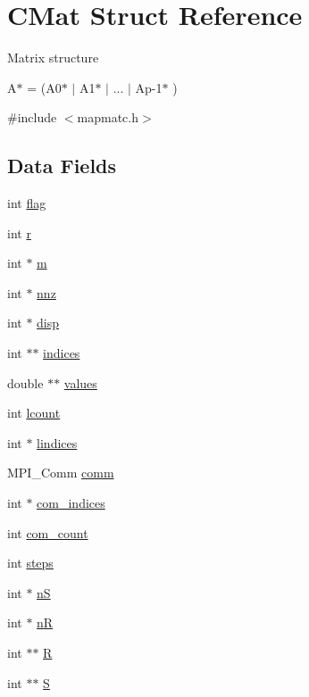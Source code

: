 \hypertarget{structCMat}{\section{C\-Mat Struct Reference}
\label{structCMat}
}


Matrix structure \par
 A$\ast$ = (A0$\ast$ $|$ A1$\ast$ $|$ ... $|$ Ap-\/1$\ast$ )  




{\ttfamily \#include $<$mapmatc.\-h$>$}

\subsection*{Data Fields}
\begin{DoxyCompactItemize}
\item 
int \hyperlink{structCMat_a60c04e2249af43059a609a437205bead}{flag}
\item 
int \hyperlink{structCMat_aaa75f5afbded481f194bfff507ebe551}{r}
\item 
int $\ast$ \hyperlink{structCMat_a6837ab815749a87fa96084527166b564}{m}
\item 
int $\ast$ \hyperlink{structCMat_abaaf4cbc8c0c1a456f3fc13ee3a6b5b9}{nnz}
\item 
int $\ast$ \hyperlink{structCMat_a7eb91e1b71eed5d46554741cc6f85337}{disp}
\item 
int $\ast$$\ast$ \hyperlink{structCMat_a69c30ab5fc10323e476ca1d0fb5f49c2}{indices}
\item 
double $\ast$$\ast$ \hyperlink{structCMat_a79ec69419609913aeb4f95d362c615c7}{values}
\item 
int \hyperlink{structCMat_a86a944fad57e8ca9dbe63e15e73ccb03}{lcount}
\item 
int $\ast$ \hyperlink{structCMat_aab35bdadef0a9b8393bee5854c37fb1c}{lindices}
\item 
M\-P\-I\-\_\-\-Comm \hyperlink{structCMat_a8604ef4463b1862237ee574bd8d2fdfb}{comm}
\item 
int $\ast$ \hyperlink{structCMat_a5a220180ab228481a631a01c9b74cbef}{com\-\_\-indices}
\item 
int \hyperlink{structCMat_ab75ef04d87dc9e4dc62adb95ea0c729a}{com\-\_\-count}
\item 
int \hyperlink{structCMat_ac7f11b4def56fa42a60aa255d1986741}{steps}
\item 
int $\ast$ \hyperlink{structCMat_a788a427e12e648fc255569a6255a1201}{n\-S}
\item 
int $\ast$ \hyperlink{structCMat_a82bfd1296c5a77b759046de488437601}{n\-R}
\item 
int $\ast$$\ast$ \hyperlink{structCMat_a96d82ea984608c87edb52bf17f63a827}{R}
\item 
int $\ast$$\ast$ \hyperlink{structCMat_a29acbc37cb0a4864ce6958808059766d}{S}
\end{DoxyCompactItemize}


